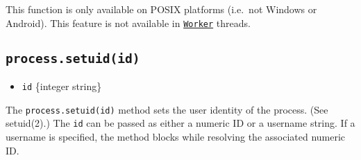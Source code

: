 This function is only available on POSIX platforms (i.e.~not Windows or
Android). This feature is not available in
\href{worker_threads.md\#class-worker}{\texttt{Worker}} threads.

\subsection{\texorpdfstring{\texttt{process.setuid(id)}}{process.setuid(id)}}\label{process.setuidid}

\begin{itemize}
\tightlist
\item
  \texttt{id} \{integer \textbar{} string\}
\end{itemize}

The \texttt{process.setuid(id)} method sets the user identity of the
process. (See setuid(2).) The \texttt{id} can be passed as either a
numeric ID or a username string. If a username is specified, the method
blocks while resolving the associated numeric ID.

\begin{Shaded}
\begin{Highlighting}[]
   \OperatorTok{;}

\NormalTok{ (} \OperatorTok{\&\&} \NormalTok{) \{}
  \NormalTok{(}\SpecialCharTok{$\{}\NormalTok{()}\SpecialCharTok{\}}\VerbatimStringTok{\textasciigrave{}}\NormalTok{)}\OperatorTok{;}
  \NormalTok{ \{}
    \NormalTok{(}\NormalTok{)}\OperatorTok{;}
    \NormalTok{(}\SpecialCharTok{$\{}\NormalTok{()}\SpecialCharTok{\}}\VerbatimStringTok{\textasciigrave{}}\NormalTok{)}\OperatorTok{;}
\NormalTok{  \} }
    \NormalTok{(}\SpecialCharTok{$\{}\SpecialCharTok{\}}\VerbatimStringTok{\textasciigrave{}}\NormalTok{)}\OperatorTok{;}
\NormalTok{  \}}
\NormalTok{\}}
\end{Highlighting}
\end{Shaded}

